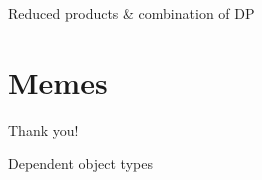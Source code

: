 \documentclass[aspectratio=169,14pt]{beamer}
\begin{document}
\begin{frame}{Reduced products \& combination of DP}
\end{frame}

\section{Memes}
\begin{frame}{}\end{frame}

\begin{frame}[standout]
  Thank you!
\end{frame}

\appendix

\begin{frame}{Dependent object types}
  
\end{frame}
\end{document}
